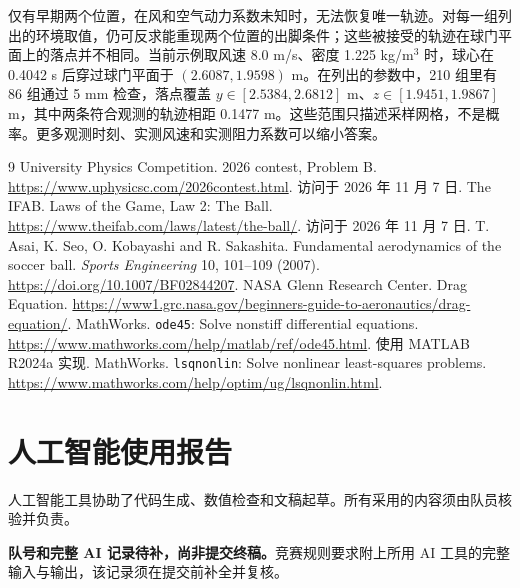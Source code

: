 \documentclass[11pt,a4paper,UTF8,fontset=windows]{ctexart}
\begin{document}
仅有早期两个位置，在风和空气动力系数未知时，无法恢复唯一轨迹。对每一组列出的环境取值，仍可反求能重现两个位置的出脚条件；这些被接受的轨迹在球门平面上的落点并不相同。当前示例取风速 8.0 m/s、密度 1.225 kg/m$^3$ 时，球心在 0.4042 s 后穿过球门平面于 $(2.6087,1.9598)$ m。在列出的参数中，210 组里有 86 组通过 5 mm 检查，落点覆盖 $y\in[2.5384,2.6812]$ m、$z\in[1.9451,1.9867]$ m，其中两条符合观测的轨迹相距 0.1477 m。这些范围只描述采样网格，不是概率。更多观测时刻、实测风速和实测阻力系数可以缩小答案。

\begingroup\small\raggedright
\begin{thebibliography}{9}
 University Physics Competition. 2026 contest, Problem B. \url{https://www.uphysicsc.com/2026contest.html}. 访问于 2026 年 11 月 7 日.
 The IFAB. Laws of the Game, Law 2: The Ball. \url{https://www.theifab.com/laws/latest/the-ball/}. 访问于 2026 年 11 月 7 日.
 T. Asai, K. Seo, O. Kobayashi and R. Sakashita. Fundamental aerodynamics of the soccer ball. \emph{Sports Engineering} 10, 101--109 (2007). \url{https://doi.org/10.1007/BF02844207}.
 NASA Glenn Research Center. Drag Equation. \url{https://www1.grc.nasa.gov/beginners-guide-to-aeronautics/drag-equation/}.
 MathWorks. \texttt{ode45}: Solve nonstiff differential equations. \url{https://www.mathworks.com/help/matlab/ref/ode45.html}. 使用 MATLAB R2024a 实现.
 MathWorks. \texttt{lsqnonlin}: Solve nonlinear least-squares problems. \url{https://www.mathworks.com/help/optim/ug/lsqnonlin.html}.
\end{thebibliography}

\smallskip\small
\section*{人工智能使用报告}
人工智能工具协助了代码生成、数值检查和文稿起草。所有采用的内容须由队员核验并负责。

\textbf{队号和完整 AI 记录待补，尚非提交终稿。}竞赛规则要求附上所用 AI 工具的完整输入与输出，该记录须在提交前补全并复核。
\endgroup
\end{document}
